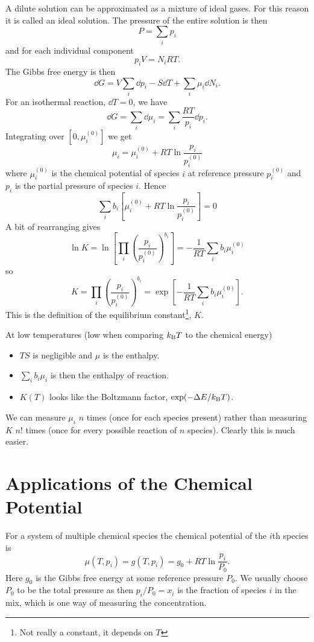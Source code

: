     A dilute solution can be approximated as a mixture of ideal gases.
    For this reason it is called an ideal solution.
    The pressure of the entire solution is then
    \[P = \sum_{i} p_i\]
    and for each individual component
    \[p_iV = N_iRT.\]
    The Gibbs free energy is then
    \[\dd{G} = V\sum_{i} \dd{p_i} - S\dd{T} + \sum_i \mu_i\dd{N_i}.\]
    For an isothermal reaction, \(\dd{T} = 0\), we have
    \[\dd{G} = \sum_i \dd{\mu_i} = \sum_i \frac{RT}{p_i}\dd{p_i}.\]
    Integrating over \([0, \mu_i^{(0)}]\) we get
    \[\mu_i = \mu_i^{(0)} + RT\ln\frac{p_i}{p_i^{(0)}}\]
    where \(\mu_i^{(0)}\) is the chemical potential of species \(i\) at reference pressure \(p_i^{(0)}\) and \(p_i\) is the partial pressure of species \(i\).
    Hence
    \[\sum_i b_i \left[\mu_i^{(0)} + RT\ln\frac{p_i}{p_i^{(0)}}\right] = 0\]
    A bit of rearranging gives
    \[\ln K = \ln\left[\prod_i \left(\frac{p_i}{p_i^{(0)}}\right)^{b_i}\right] = -\frac{1}{RT}\sum_i b_i\mu_i^{(0)}\]
    so
    \[K = \prod_i \left(\frac{p_i}{p_i^{(0)}}\right)^{b_i} = \exp\left[-\frac{1}{RT}\sum_i b_i\mu_i^{(0)}\right].\]
    This is the definition of the equilibrium constant\footnote{Not really a constant, it depends on \(T\)}, \(K\).
    
    At low temperatures (low when comparing \(k_\mathrm{B} T\) to the chemical energy)
    \begin{itemize}
        \item \(TS\) is negligible and \(\mu\) is the enthalpy.
        \item \(\sum_i b_i\mu_i\) is then the enthalpy of reaction.
        \item \(K(T)\) looks like the Boltzmann factor, \(\exp(-\Delta E/k_\mathrm{B} T)\).
    \end{itemize}
    We can measure \(\mu_i\) \(n\) times (once for each species present) rather than measuring \(K\) \(n!\) times (once for every possible reaction of \(n\) species).
    Clearly this is much easier.
    
    \section{Applications of the Chemical Potential}
    For a system of multiple chemical species the chemical potential of the \(i\)th species is
    \[\mu(T, p_i) = g(T, p_i) = g_0 + RT\ln\frac{p_i}{P_0}.\]
    Here \(g_0\) is the Gibbs free energy at some reference pressure \(P_0\).
    We usually choose \(P_0\) to be the total pressure as then \(p_i/P_0 = x_i\) is the fraction of species \(i\) in the mix, which is one way of measuring the concentration.
    
